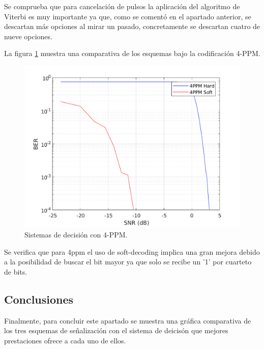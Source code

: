 Se comprueba que para cancelación de pulsos la aplicación del algoritmo de Viterbi 
es muy importante ya que, como se comentó en el apartado anterior, se descartan más 
opciones al mirar un pasado, concretamente se descartan cuatro de nueve opciones.

La figura \ref{4ppm} muestra una comparativa de los esquemas bajo 
la codificación 4-PPM.

\begin{figure}[ht]
    \centering
    \includegraphics[scale=0.6]{./figuras/4ppm.pdf}
    \caption{\small{Sistemas de decisión con 4-PPM.}}
    \label{4ppm}%
\end{figure}

Se verifica que para 4ppm el uso de soft-decoding implica una gran mejora debido a 
la posibilidad de buscar el bit mayor ya que solo se recibe un '1' por cuarteto de bits.

\subsection{Conclusiones}
Finalmente, para concluir este apartado se muestra una gráfica comparativa de los 
tres esquemas de señalización con el sistema de deicisón que mejores prestaciones ofrece
a cada uno de ellos.

